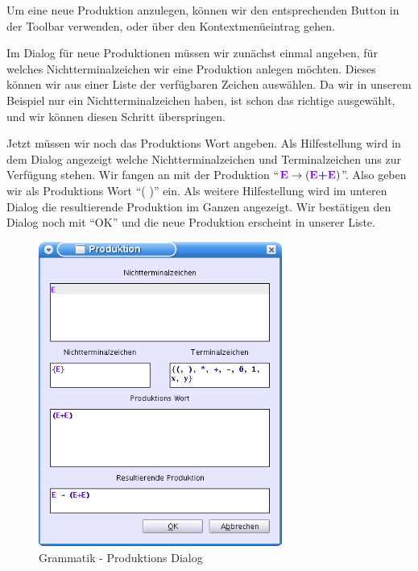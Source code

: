 Um eine neue Produktion anzulegen, können wir den entsprechenden Button in der
Toolbar verwenden, oder über den Kontextmenüeintrag gehen.\vspace{10pt}

Im Dialog für neue Produktionen müssen wir zunächst einmal angeben, für welches
Nichtterminalzeichen wir eine Produktion anlegen möchten. Dieses können wir aus
einer Liste der verfügbaren Zeichen auswählen. Da wir in unserem Beispiel nur
ein Nichtterminalzeichen haben, ist schon das richtige ausgewählt, und wir
können diesen Schritt überspringen.\vspace{10pt}

Jetzt müssen wir noch das Produktions Wort angeben. Als Hilfestellung wird in dem
Dialog angezeigt welche Nichtterminalzeichen und Terminalzeichen uns zur
Verfügung stehen. Wir fangen an mit der Produktion "`$\StartSymbol{E} \to
(\StartSymbol{E} \TerminalSymbol{+} \StartSymbol{E})$"'. Also geben wir als
Produktions Wort "`( \TerminalSymbol{+} )"' ein.
Als weitere Hilfestellung wird im unteren Dialog die resultierende Produktion im
Ganzen angezeigt. Wir bestätigen den Dialog noch mit "`OK"' und die neue
Produktion erscheint in unserer Liste.\vspace{10pt}

\begin{figure}[h]
\begin{center}
\includegraphics[width=8cm]{../images/production_dialog.png}
\caption{Grammatik - Produktions Dialog}
\end{center}
\end{figure}

